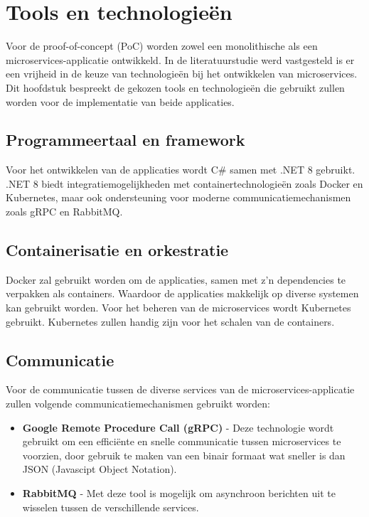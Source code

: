 \section{Tools en technologieën}
\label{tools_en_technologieën}

Voor de proof-of-concept (PoC) worden zowel een monolithische als een microservices-applicatie ontwikkeld. In de literatuurstudie werd vastgesteld is er een vrijheid in de keuze van technologieën bij het ontwikkelen van microservices. Dit hoofdstuk bespreekt de gekozen tools en technologieën die gebruikt zullen worden voor de implementatie van beide applicaties.

\subsection{Programmeertaal en framework}

Voor het ontwikkelen van de applicaties wordt C\# samen met .NET 8 gebruikt. .NET 8 biedt integratiemogelijkheden met containertechnologieën zoals Docker en Kubernetes, maar ook ondersteuning voor moderne communicatiemechanismen zoals gRPC en RabbitMQ.

\subsection{Containerisatie en orkestratie}

Docker zal gebruikt worden om de applicaties, samen met z'n dependencies te verpakken als containers. Waardoor de applicaties makkelijk op diverse systemen kan gebruikt worden. Voor het beheren van de microservices wordt Kubernetes gebruikt. Kubernetes zullen handig zijn voor het schalen van de containers.

\subsection{Communicatie}

Voor de communicatie tussen de diverse services van de microservices-applicatie zullen volgende communicatiemechanismen gebruikt worden:

\begin{itemize}
	\item \textbf{Google Remote Procedure Call (gRPC)} - Deze technologie wordt gebruikt om een efficiënte en snelle communicatie tussen microservices te voorzien, door gebruik te maken van een binair formaat wat sneller is dan JSON (Javascipt Object Notation).
	\item \textbf{RabbitMQ} - Met deze tool is mogelijk om asynchroon berichten uit te wisselen tussen de verschillende services.
\end{itemize}

